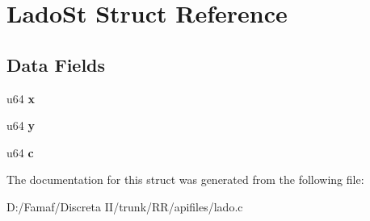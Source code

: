 \hypertarget{struct_lado_st}{\section{Lado\+St Struct Reference}
\label{struct_lado_st}
}
\subsection*{Data Fields}
\begin{DoxyCompactItemize}
\item 
\hypertarget{struct_lado_st_a04498d52117f705673d513847d9e0e6b}{u64 {\bfseries x}}\label{struct_lado_st_a04498d52117f705673d513847d9e0e6b}

\item 
\hypertarget{struct_lado_st_a239d98618fd31de7d8d7a94d7beb3ed7}{u64 {\bfseries y}}\label{struct_lado_st_a239d98618fd31de7d8d7a94d7beb3ed7}

\item 
\hypertarget{struct_lado_st_aafde18f8cc76a12c881282060f3645ae}{u64 {\bfseries c}}\label{struct_lado_st_aafde18f8cc76a12c881282060f3645ae}

\end{DoxyCompactItemize}


The documentation for this struct was generated from the following file\+:\begin{DoxyCompactItemize}
\item 
D\+:/\+Famaf/\+Discreta I\+I/trunk/\+R\+R/apifiles/lado.\+c\end{DoxyCompactItemize}
